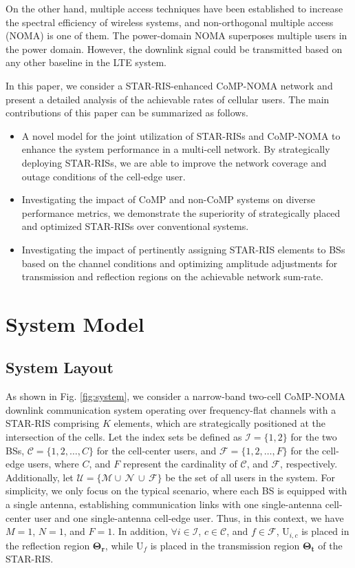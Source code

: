 \documentclass[conference]{IEEEtran}
\begin{document}
On the other hand, multiple access techniques have been established to increase the spectral efficiency of wireless systems, and non-orthogonal multiple access (NOMA) is one of them. The power-domain NOMA superposes multiple users in the power domain. However, the downlink signal could be transmitted based on any other baseline in the LTE system.

In this paper, we consider a STAR-RIS-enhanced CoMP-NOMA network and present a detailed analysis of the achievable rates of cellular users. The main contributions of this paper can be summarized as follows.
\begin{itemize}
    \item  A novel model for the joint utilization of
          STAR-RISs and CoMP-NOMA to enhance the system performance in a multi-cell network. By strategically deploying STAR-RISs, we are able to improve the network coverage and outage conditions of the cell-edge user.
    \item Investigating the impact of CoMP and non-CoMP systems on diverse performance metrics, we demonstrate the superiority of strategically placed and optimized STAR-RISs over conventional systems.
    \item Investigating the impact of pertinently assigning STAR-RIS elements to BSs based on the channel conditions and optimizing amplitude adjustments for transmission and reflection regions on the achievable network sum-rate.

\end{itemize}

\section{System Model}
\subsection{System Layout}
As shown in Fig. \ref{fig:system}, we consider a narrow-band two-cell CoMP-NOMA downlink communication system operating over frequency-flat channels with a STAR-RIS comprising $K$ elements, which are strategically positioned at the intersection of the cells.
Let the index sets be defined as $\mathcal{I} = \{1, 2\}$ for the two BSs, $\mathcal{C} = \{1, 2,\dots, C\}$ for the cell-center users, and $\mathcal{F} = \{1, 2,\dots, F\}$ for the cell-edge users, where $C$, and $F$ represent the cardinality of $\mathcal{C}$, and $\mathcal{F}$, respectively. Additionally, let $\mathcal{U} = \{\mathcal{M}\cup\,\mathcal{N}\,\cup\,\mathcal{F}\}$ be the set of all users in the system. For simplicity, we only focus on the typical scenario, where each BS is equipped with a single antenna, establishing communication links with one single-antenna cell-center user and one single-antenna cell-edge user. Thus, in this context, we have $M=1$, $N=1$, and $F=1$. In addition, $\forall i \in \mathcal{I}$, $c \in \mathcal{C}$, and $f \in \mathcal{F}$, U$_{i,c}$ is placed in the reflection region $\mathbf{\Theta_r}$, while U$_f$ is placed in the transmission region $\mathbf{\Theta_t}$ of the STAR-RIS.
\end{document}
